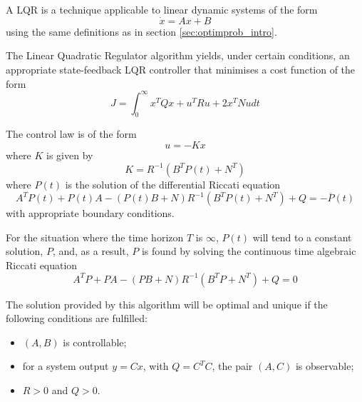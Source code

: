 \par A \acl{LQR} is a technique applicable to linear dynamic systems of the form
\begin{equation}
    \label{eq:dynamic_system}
    \dot{x} = A x + B
\end{equation}
using the same definitions as in section \ref{sec:optimprob_intro}.

\par The Linear Quadratic Regulator algorithm yields, under certain conditions, an appropriate state-feedback LQR controller that minimises a cost function of the form
\begin{equation}
    \label{eq:quadratic_cost}
    J = \int_0^\infty x^T Q x + u^T R u + 2x^T N u dt
\end{equation}

\par The control law is of the form
\begin{equation}
    \label{eq:feedback}
    u = -Kx
\end{equation}
where $K$ is given by
\begin{equation}
    \label{eq:k_expression}
    K = R^{-1} (B^T P(t) + N^T)
\end{equation}
where $P(t)$ is the solution of the differential Riccati equation \cite{riccati1724animadversiones}
\begin{equation}
    \label{eq:p_diff_expression}
    A^T P(t) + P(t) A - (P(t) B + N) R^{-1} (B^T P(t) + N^T) + Q = - \overline{P}(t)
\end{equation}
with appropriate boundary conditions.

\par For the situation where the time horizon $T$ is $\infty$, $P(t)$ will tend to a constant solution, $P$, and, as a result, $P$ is found by solving the continuous time algebraic Riccati equation 
\begin{equation}
    \label{eq:p_expression}
    A^T P + PA - (PB + N) R^{-1} (B^T P + N^T) + Q = 0
\end{equation}


\par The solution provided by this algorithm will be optimal and unique if the following conditions are fulfilled:
\begin{itemize}
    \item $(A,B)$ is controllable;
    \item for a system output $y = C x$, with $Q=C^T C$, the pair $(A,C)$ is observable;
    \item $R>0$ and $Q>0$.
\end{itemize}

